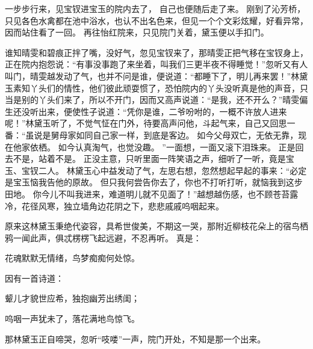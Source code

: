 一步步行来，见宝钗进宝玉的院内去了，
自己也便随后走了来。
刚到了沁芳桥，只见各色水禽都在池中浴水，也认不出名色来，但见一个个文彩炫耀，好看异常，因而站住看了一回。
再往怡红院来，只见院门关着，黛玉便以手扣门。
\par
谁知晴雯和碧痕正拌了嘴，没好气，忽见宝钗来了，那晴雯正把气移在宝钗身上，正在院内抱怨说：“有事没事跑了来坐着，叫我们三更半夜不得睡觉！”忽听又有人叫门，晴雯越发动了气，也并不问是谁，便说道：“都睡下了，明儿再来罢！”林黛玉素知丫头们的情性，他们彼此顽耍惯了，恐怕院内的丫头没听真是他的声音，只当是别的丫头们来了，所以不开门，因而又高声说道：“是我，还不开么？”晴雯偏生还没听出来，便使性子说道：“凭你是谁，二爷吩咐的，一概不许放人进来呢！”林黛玉听了，不觉气怔在门外，待要高声问他，斗起气来，自己又回思一番：“虽说是舅母家如同自己家一样，到底是客边。
如今父母双亡，无依无靠，现在他家依栖。
如今认真淘气，也觉没趣。
”一面想，一面又滚下泪珠来。
正是回去不是，站着不是。
正没主意，只听里面一阵笑语之声，细听了一听，竟是宝玉、宝钗二人。
林黛玉心中益发动了气，左思右想，忽然想起早起的事来：“必定是宝玉恼我告他的原故。
但只我何尝告你去了，你也不打听打听，就恼我到这步田地。
你今儿不叫我进来，难道明儿就不见面了！”越想越伤感，也不顾苍苔露冷，花径风寒，独立墙角边花阴之下，悲悲戚戚呜咽起来。
\par
原来这林黛玉秉绝代姿容，具希世俊美，不期这一哭，那附近柳枝花朵上的宿鸟栖鸦一闻此声，俱忒楞楞飞起远避，不忍再听。
真是：\par
\hop
花魂默默无情绪，鸟梦痴痴何处惊。
\par
\hop
因有一首诗道：\par
颦儿才貌世应希，独抱幽芳出绣闺；\par
呜咽一声犹未了，落花满地鸟惊飞。
\par
\hop
那林黛玉正自啼哭，忽听“吱喽”一声，院门开处，不知是那一个出来。

